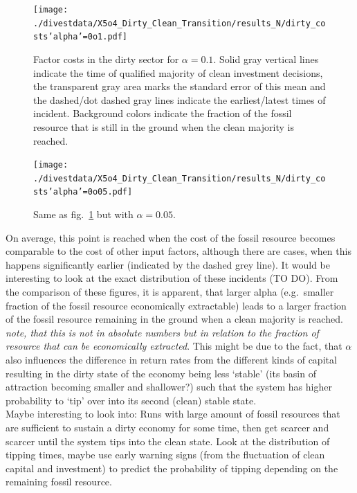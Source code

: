 \begin{figure}[H]
	\centering
	\texttt{[image: ./divestdata/X5o4\_Dirty\_Clean\_Transition/results\_N/dirty\_costs'alpha'=0o1.pdf]}
	\caption{Factor costs in the dirty sector for $\alpha = 0.1$. Solid gray vertical lines indicate the time of qualified majority of clean investment decisions, the transparent gray area marks the standard error of this mean and the dashed/dot dashed gray lines indicate the earliest/latest times of incident. Background colors indicate the fraction of the fossil resource that is still in the ground when the clean majority is reached.}
	\label{fig:learning_dirty_cost0o1}
\end{figure}
\begin{figure}[H]
	\centering
	\texttt{[image: ./divestdata/X5o4\_Dirty\_Clean\_Transition/results\_N/dirty\_costs'alpha'=0o05.pdf]}
	\caption{Same as fig.~\ref{fig:learning_dirty_cost0o1} but with $\alpha = 0.05$.}
	\label{fig:learning_dirty_cost0o05}
\end{figure}
On average, this point is reached when the cost of the fossil resource becomes comparable to the cost of other input factors, although there are cases, when this happens  significantly earlier (indicated by the dashed grey line). It would be interesting to look at the exact distribution of these incidents (TO DO).
From the comparison of these figures, it is apparent, that larger alpha (e.g.\ smaller fraction of the fossil resource economically extractable) leads to a larger fraction of the fossil resource remaining in the ground when a clean majority is reached. \textit{note, that this is not in absolute numbers but in relation to the fraction of resource that can be economically extracted}.
This might be due to the fact, that $\alpha$ also influences the difference in return rates from the different kinds of capital resulting in the dirty state of the economy being less `stable' (its basin of attraction becoming smaller and shallower?) such that the system has higher probability to `tip' over into its second (clean) stable state. \\

Maybe interesting to look into: Runs with large amount of fossil resources that are sufficient to sustain a dirty economy for some time, then get scarcer and scarcer until the system tips into the clean state. Look at the distribution of tipping times, maybe use early warning signs (from the fluctuation of clean capital and investment) to predict the probability of tipping depending on the remaining fossil resource.

